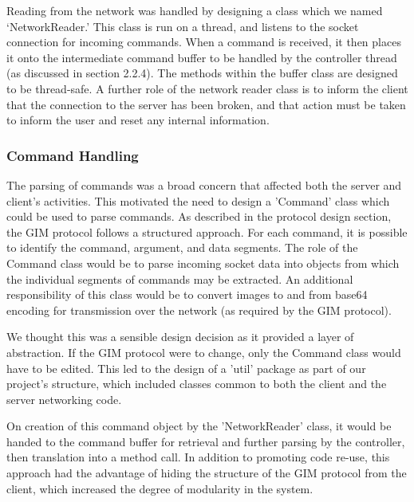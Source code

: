 Reading from the network was handled by designing a class which we named `NetworkReader.' This class is run on a thread, and listens to the socket connection for incoming commands. When a command is received, it then places it onto the intermediate command buffer to be handled by the controller thread (as discussed in section 2.2.4). The methods within the buffer class are designed to be thread-safe. A further role of the network reader class is to inform the client that the connection to the server has been broken, and that action must be taken to inform the user and reset any internal information.

\subsubsection {Command Handling}

The parsing of commands was a broad concern that affected both the server and client's activities. This motivated the need to design a 'Command' class which could be used to parse commands. As described in the protocol design section, the GIM protocol follows a structured approach. For each command, it is possible to identify the command, argument, and data segments. The role of the Command class would be to parse incoming socket data into objects from which the individual segments of commands may be extracted. An additional responsibility of this class would be to convert images to and from base64 encoding for transmission over the network (as required by the GIM protocol).

We thought this was a sensible design decision as it provided a layer of abstraction. If the GIM protocol were to change, only the Command class would have to be edited. This led to the design of a 'util' package as part of our project's structure, which included classes common to both the client and the server networking code. 

On creation of this command object by the 'NetworkReader' class, it would be handed to the command buffer for retrieval and further parsing by the controller, then translation into a method call. In addition to promoting code re-use, this approach had the advantage of hiding the structure of the GIM protocol from the client, which increased the degree of modularity in the system.   

















